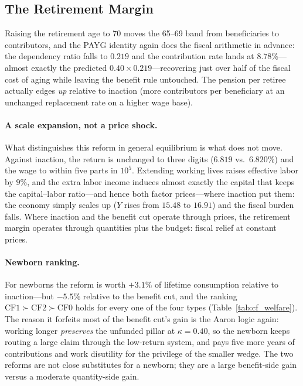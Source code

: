 \documentclass[12pt,a4paper]{article}
\begin{document}
\subsection{The Retirement Margin}
\label{subsec:cf_retirement}

Raising the retirement age to 70 moves the 65--69 band from beneficiaries to contributors, and the PAYG identity again does the fiscal arithmetic in advance: the dependency ratio falls to $0.219$ and the contribution rate lands at $8.78\%$---almost exactly the predicted $0.40\times0.219$---recovering just over half of the fiscal cost of aging while leaving the benefit rule untouched. The pension per retiree actually edges \emph{up} relative to inaction (more contributors per beneficiary at an unchanged replacement rate on a higher wage base).

\paragraph{A scale expansion, not a price shock.} What distinguishes this reform in general equilibrium is what does not move. Against inaction, the return is unchanged to three digits ($6.819$ vs.\ $6.820\%$) and the wage to within five parts in $10^{5}$. Extending working lives raises effective labor by $9\%$, and the extra labor income induces almost exactly the capital that keeps the capital--labor ratio---and hence both factor prices---where inaction put them: the economy simply scales up ($Y$ rises from $15.48$ to $16.91$) and the fiscal burden falls. Where inaction and the benefit cut operate through prices, the retirement margin operates through quantities plus the budget: fiscal relief at constant prices.

\paragraph{Newborn ranking.} For newborns the reform is worth $+3.1\%$ of lifetime consumption relative to inaction---but $-5.5\%$ relative to the benefit cut, and the ranking $\mathrm{CF1}\succ\mathrm{CF2}\succ\mathrm{CF0}$ holds for every one of the four types (Table~\ref{tab:cf_welfare}). The reason it forfeits most of the benefit cut's gain is the Aaron logic again: working longer \emph{preserves} the unfunded pillar at $\kappa=0.40$, so the newborn keeps routing a large claim through the low-return system, and pays five more years of contributions and work disutility for the privilege of the smaller wedge. The two reforms are not close substitutes for a newborn; they are a large benefit-side gain versus a moderate quantity-side gain.
\end{document}
